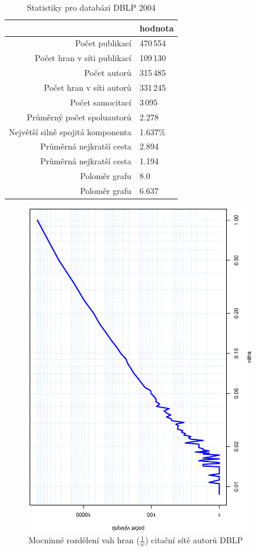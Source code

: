 \documentclass{bakalarka}
\begin{document}
\begin{table}[!ht]
\begin{center}
\begin{tabular}{r|l}
\toprule
& hodnota \\
\midrule
Počet publikací & 470\,554 \\
Počet hran v síti publikací & 109\,130 \\
Počet autorů & 315\,485 \\
Počet hran v síti autorů & 331\,245 \\
Počet samocitací & 3\,095 \\
Průměrný počet spoluautorů & 2.278 \\
Největší silně spojitá komponenta & 1.637\% \\
Průměrná nejkratší cesta\footnotemark[1] & 2.894 \\
Průměrná nejkratší cesta\footnotemark[2] & 1.194 \\
Poloměr grafu\footnotemark[1] & 8.0 \\
Poloměr grafu\footnotemark[2] & 6.637 \\
\bottomrule
\end{tabular}
\caption{Statistiky pro databázi DBLP 2004}
\label{tab:dblpstat}
\end{center}
\end{table}

\begin{figure}[!ht]
\centering
	\includegraphics[width=10cm,angle=270]{ewd.eps}
	\caption{Mocninné rozdělení vah hran ($\frac{1}{w}$) citační sítě autorů DBLP}
\end{figure}
\end{document}
